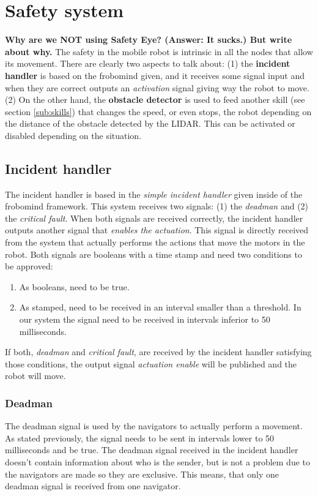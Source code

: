 \section{Safety system} %
\label{sec:mr_safety_system}
\textbf{Why are we NOT using Safety Eye? (Answer: It sucks.) But write about why.}
The safety in the mobile robot is intrinsic in all the nodes that allow its movement.
There are clearly two aspects to talk about: (1) the \textbf{incident handler} is based on the frobomind given, and it receives some signal input and when they are correct outputs an \emph{activation} signal giving way the robot to move.
(2) On the other hand, the \textbf{obstacle detector} is used to feed another skill (see section \ref{sub:skills}) that changes the speed, or even stops, the robot depending on the distance of the obstacle detected by the LIDAR.
This can be activated or disabled depending on the situation.
	\subsection{Incident handler} %
	\label{sub:mr_incident_handler}
	The incident handler is based in the \emph{simple incident handler} given inside of the frobomind framework.
	This system receives two signals: (1) the \emph{deadman} and (2) the \emph{critical fault}.
	When both signals are received correctly, the incident handler outputs another signal that \emph{enables the actuation}.
	This signal is directly received from the system that actually performs the actions that move the motors in the robot.
	Both signals are booleans with a time stamp and need two conditions to be approved:
	\begin{enumerate}
		\item As booleans, need to be true.
		\item As stamped, need to be received in an interval smaller than a threshold. In our system the signal need to be received in intervals inferior to 50 milliseconds.
	\end{enumerate}
	If both, \emph{deadman} and \emph{critical fault}, are received by the incident handler satisfying those conditions, the output signal \emph{actuation enable} will be published and the robot will move.
		\subsubsection{Deadman} %
		\label{ssub:mr_deadman}
		The deadman signal is used by the navigators to actually perform a movement.
		As stated previously, the signal needs to be sent in intervals lower to 50 milliseconds and be true.
		The deadman signal received in the incident handler doesn't contain information about who is the sender, but is not a problem due to the navigators are made so they are exclusive.
		This means, that only one deadman signal is received from one navigator.

